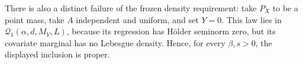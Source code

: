 There is also a distinct failure of the frozen density requirement: take \(P_X\) to be a point mass, take \(A\) independent and uniform, and set \(Y=0\). This law lies in \(\mathcal Q_1(\alpha,d,M_Y,L)\), because its regression has H\"older seminorm zero, but its covariate marginal has no Lebesgue density. Hence, for every \(\beta,s>0\), the displayed inclusion is proper.